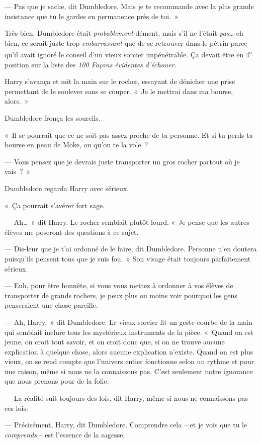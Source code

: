 --- Pas que je sache, dit Dumbledore. Mais je te recommande avec la plus grande insistance que tu le gardes en permanence près de toi.~»

Très bien. Dumbledore était \emph{probablement} dément, mais s'il ne l'était \emph{pas}… eh bien, ce serait juste trop \emph{embarrassant} que de se retrouver dans le pétrin parce qu'il avait ignoré le conseil d'un vieux sorcier impénétrable. Ça devait être en 4\textsuperscript{e} position sur la liste des \emph{100 Façons évidentes d'échouer}.

Harry s'avança et mit la main sur le rocher, essayant de dénicher une prise permettant de le soulever sans se couper. «~Je le mettrai dans ma bourse, alors.~»

Dumbledore fronça les sourcils.

«~Il se pourrait que ce ne soit pas assez proche de ta personne. Et si tu perds ta bourse en peau de Moke, ou qu'on te la vole~?

--- Vous pensez que je devrais juste transporter un gros rocher partout où je vais~?~»

Dumbledore regarda Harry avec sérieux.

«~Ça pourrait s'avérer fort sage.

--- Ah…~» dit Harry. Le rocher semblait plutôt lourd. «~Je pense que les autres élèves me poseront des questions à ce sujet.

--- Dis-leur que je t'ai ordonné de le faire, dit Dumbledore. Personne n'en doutera puisqu'ils pensent tous que je suis fou.~» Son visage était toujours parfaitement sérieux.

--- Euh, pour être honnête, si vous vous mettez à ordonner à vos élèves de transporter de grands rochers, je peux plus ou moins voir pourquoi les gens penseraient une chose pareille.

--- Ah, Harry,~» dit Dumbledore. Le vieux sorcier fit un geste courbe de la main qui semblait inclure tous les mystérieux instruments de la pièce. «~Quand on est jeune, on croit tout savoir, et on croit donc que, si on ne trouve aucune explication à quelque chose, alors aucune explication n'existe. Quand on est plus vieux, on se rend compte que l'univers entier fonctionne selon un rythme et pour une raison, même si nous ne la connaissons pas. C'est seulement notre ignorance que nous prenons pour de la folie.

--- La réalité suit toujours des lois, dit Harry, même si nous ne connaissons pas ces lois.

--- Précisément, Harry, dit Dumbledore. Comprendre cela -- et je vois que tu le \emph{comprends} -- est l'essence de la sagesse.


